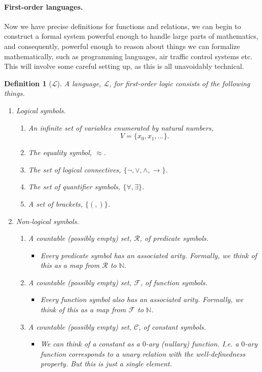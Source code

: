 \documentclass{article}
\theoremstyle{plain}
\newtheorem{definition}[theorem]{Definition}{\bfseries}{\upshape}
\newcommand{\bN}{\mathbb{N}}
\newcommand{\cR}{\mathcal{R}}
\newcommand{\cF}{\mathcal{F}}
\newcommand{\cC}{\mathcal{C}}
\newcommand{\sL}{\mathscr{L}}
\begin{document}
\paragraph{First-order languages.}

Now we have precise definitions for functions and relations, we can begin to construct a formal system powerful enough to handle large parts of mathematics, and consequently, powerful enough to reason about things we can formalize mathematically, such as programming languages, air traffic control systems etc. This will involve some careful setting up, as this is all unavoidably technical.
\begin{definition}[$\sL$]
A language, $\sL$, for first-order logic consists of the following things.
\begin{enumerate}
\item Logical symbols.
\begin{enumerate}
\item An infinite set of variables enumerated by natural numbers, \[V=\{x_0,x_1,\ldots\}.\]
\item The equality symbol, $\approx$. 
\item The set of logical connectives, $\{\neg,\vee,\wedge,\rightarrow\}$.
\item The set of quantifier symbols, $\{\forall,\exists\}$.
\item A set  of brackets, $\{(,)\}$.
\end{enumerate}
\item Non-logical symbols.
\begin{enumerate}
\item A countable (possibly empty) set, $\cR$, of \emph{predicate} symbols. 
\begin{itemize}
\item Every predicate symbol has an associated \emph{arity}. Formally, we think of this as a map from $\cR$ to $\bN$. 
\end{itemize}
\item A countable (possibly empty) set, $\cF$, of \emph{function} symbols.
\begin{itemize}
\item Every function symbol also has an associated \emph{arity}. Formally, we think of this as a map from $\cF$ to $\bN$. 
\end{itemize}
\item A countable (possibly empty) set, $\cC$, of \emph{constant} symbols.
\begin{itemize}
\item We can think of a constant as a $0$-ary (nullary) function. I.e. a $0$-ary function corresponds to a unary relation with the well-definedness property. But this is just a single element.
\end{itemize}
\end{enumerate}
\end{enumerate} 
\end{definition}
\end{document}
